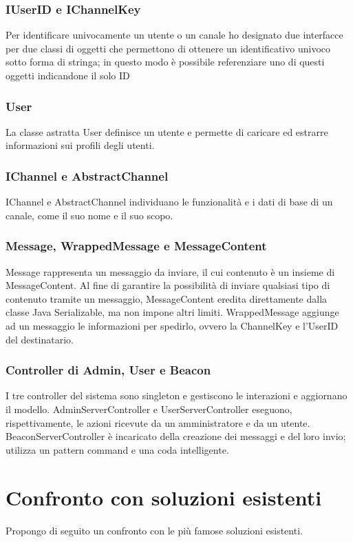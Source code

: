 		\subsubsection{IUserID e IChannelKey}
	Per identificare univocamente un utente o un canale ho designato due interfacce per due classi di oggetti che permettono di ottenere un identificativo univoco sotto forma di stringa; in questo modo è possibile referenziare uno di questi oggetti indicandone il solo ID

		\subsubsection{User}
	La classe astratta User definisce un utente e permette di caricare ed estrarre informazioni sui profili degli utenti.

		\subsubsection{IChannel e AbstractChannel}
	IChannel e AbstractChannel individuano le funzionalità e i dati di base di un canale, come il suo nome e il suo scopo.

		\subsubsection{Message, WrappedMessage e MessageContent}
	Message rappresenta un messaggio da inviare, il cui contenuto è un insieme di MessageContent. Al fine di garantire la possibilità di inviare qualsiasi tipo di contenuto tramite un messaggio, MessageContent eredita direttamente dalla classe Java Serializable, ma non impone altri limiti. WrappedMessage aggiunge ad un messaggio le informazioni per spedirlo, ovvero la ChannelKey e l'UserID del destinatario.

		\subsubsection{Controller di Admin, User e Beacon}
	I tre controller del sistema sono singleton e gestiscono le interazioni e aggiornano il modello. AdminServerController e UserServerController eseguono, rispettivamente, le azioni ricevute da un amministratore e da un utente. BeaconServerController è incaricato della creazione dei messaggi e del loro invio; utilizza un pattern command e una coda intelligente.

\section{Confronto con soluzioni esistenti}
Propongo di seguito un confronto con le più famose soluzioni esistenti.
